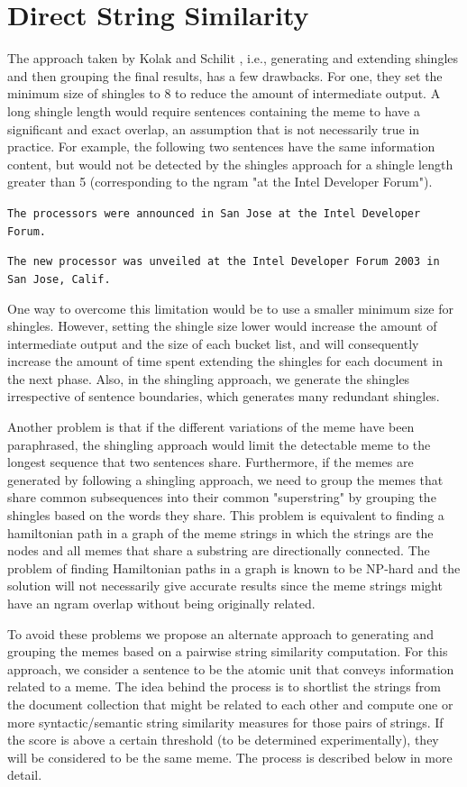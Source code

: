 \documentclass{acm_proc_article-sp}
\begin{document}
\section{Direct String Similarity}
The approach taken by Kolak and Schilit  \cite{kolak2008generating}, i.e., generating and extending shingles and then grouping the final results, has a few drawbacks. For one, they set the minimum size of shingles to 8 to reduce the amount of intermediate output. A long shingle length would require sentences containing the meme to have a significant and exact overlap, an assumption that is not necessarily true in practice. For example, the following two sentences have the same information content, but would not be detected by the shingles approach for a shingle length greater than 5 (corresponding to the ngram "at the Intel Developer Forum"). 

{\tt The processors were announced in San Jose at the Intel Developer Forum.}

{\tt The new processor was unveiled at the Intel Developer Forum 2003 in San Jose, Calif.}

One way to overcome this limitation would be to use a smaller minimum size for shingles. However, setting the shingle size lower would increase the amount of intermediate output and the size of each bucket list, and will consequently increase the amount of time spent extending the shingles for each document in the next phase. Also, in the shingling approach, we generate the shingles irrespective of sentence boundaries, which generates many redundant shingles.


Another problem is that if the different variations of the meme have been paraphrased, the shingling approach would limit the detectable meme to the longest sequence that two sentences share. Furthermore, if the memes are generated by following a shingling approach, we need to group the memes that share common subsequences into their common "superstring" by grouping the shingles based on the words they share. This problem is equivalent to finding a hamiltonian path in a graph of the meme strings in which the strings are the nodes and all memes that share a substring are directionally connected. The problem of finding Hamiltonian paths in a graph is known to be NP-hard and the solution will not necessarily give accurate results since the meme strings might have an ngram overlap without being originally related.

To avoid these problems we propose an alternate approach to generating and grouping the memes based on a pairwise string similarity computation. For this approach, we consider a sentence to be the atomic unit that conveys information related to a meme. The idea behind the process is to shortlist the strings from the document collection that might be related to each other and compute one or more syntactic/semantic string similarity measures for those pairs of strings. If the score is above a certain threshold (to be determined experimentally), they will be considered to be the same meme. The process is described below in more detail.
\end{document}

